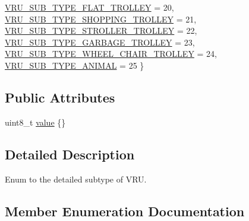 \begin{DoxyCompactItemize}
\newline
\hyperlink{structmaf__perception__interface_1_1VRUSubTypeEnum_ad7acee26966199aabeed3a89150ed10ca2abdbf51ea4a91fa04fcd8c5585349bd}{V\+R\+U\+\_\+\+S\+U\+B\+\_\+\+T\+Y\+P\+E\+\_\+\+F\+L\+A\+T\+\_\+\+T\+R\+O\+L\+L\+EY} = 20, 
\hyperlink{structmaf__perception__interface_1_1VRUSubTypeEnum_ad7acee26966199aabeed3a89150ed10ca6127413a2bfd84035ce8331b48d2ab3f}{V\+R\+U\+\_\+\+S\+U\+B\+\_\+\+T\+Y\+P\+E\+\_\+\+S\+H\+O\+P\+P\+I\+N\+G\+\_\+\+T\+R\+O\+L\+L\+EY} = 21, 
\hyperlink{structmaf__perception__interface_1_1VRUSubTypeEnum_ad7acee26966199aabeed3a89150ed10ca13546db64c3a3ddee1c3c4794ba1af54}{V\+R\+U\+\_\+\+S\+U\+B\+\_\+\+T\+Y\+P\+E\+\_\+\+S\+T\+R\+O\+L\+L\+E\+R\+\_\+\+T\+R\+O\+L\+L\+EY} = 22, 
\hyperlink{structmaf__perception__interface_1_1VRUSubTypeEnum_ad7acee26966199aabeed3a89150ed10ca0315238b499367bd3e00f35e6d8afae9}{V\+R\+U\+\_\+\+S\+U\+B\+\_\+\+T\+Y\+P\+E\+\_\+\+G\+A\+R\+B\+A\+G\+E\+\_\+\+T\+R\+O\+L\+L\+EY} = 23, 
\newline
\hyperlink{structmaf__perception__interface_1_1VRUSubTypeEnum_ad7acee26966199aabeed3a89150ed10cac67e307cc5c717a5bff02a89a676dc37}{V\+R\+U\+\_\+\+S\+U\+B\+\_\+\+T\+Y\+P\+E\+\_\+\+W\+H\+E\+E\+L\+\_\+\+C\+H\+A\+I\+R\+\_\+\+T\+R\+O\+L\+L\+EY} = 24, 
\hyperlink{structmaf__perception__interface_1_1VRUSubTypeEnum_ad7acee26966199aabeed3a89150ed10ca36e811c95a175a423948d465ed2974ba}{V\+R\+U\+\_\+\+S\+U\+B\+\_\+\+T\+Y\+P\+E\+\_\+\+A\+N\+I\+M\+AL} = 25
 \}
\end{DoxyCompactItemize}
\subsection*{Public Attributes}
\begin{DoxyCompactItemize}
\item 
uint8\+\_\+t \hyperlink{structmaf__perception__interface_1_1VRUSubTypeEnum_ab5add0ca44898d1986cad0be048d8c9d}{value} \{\}
\end{DoxyCompactItemize}


\subsection{Detailed Description}
Enum to the detailed subtype of V\+RU. 

\subsection{Member Enumeration Documentation}
\mbox{\label{structmaf__perception__interface_1_1VRUSubTypeEnum_ad7acee26966199aabeed3a89150ed10c}} 
